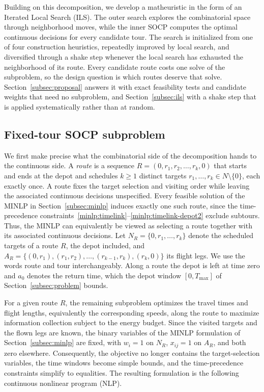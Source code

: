 Building on this decomposition, we develop a matheuristic in the form of an Iterated Local Search (ILS). The outer search explores the combinatorial space through neighborhood moves, while the inner SOCP computes the optimal continuous decisions for every candidate tour. The search is initialized from one of four construction heuristics, repeatedly improved by local search, and diversified through a shake step whenever the local search has exhausted the neighborhood of its route. Every candidate route costs one solve of the subproblem, so the design question is which routes deserve that solve. Section~\ref{subsec:proposal} answers it with exact feasibility tests and candidate weights that need no subproblem, and Section~\ref{subsec:ils} with a shake step that is applied systematically rather than at random.

\subsection{Fixed-tour SOCP subproblem}\label{subsec:socp}

We first make precise what the combinatorial side of the decomposition hands
to the continuous side. A \emph{route} is a sequence $R = (0, r_1, r_2, \ldots,
r_k, 0)$ that starts and ends at the depot and schedules $k \ge 1$ distinct targets
$r_1, \ldots, r_k \in N \setminus \{0\}$, each exactly once. A route fixes the
target selection and visiting order while leaving the associated continuous decisions
unspecified. Every feasible solution of the MINLP in Section~\ref{subsec:minlp}
induces exactly one such route, since the time-precedence
constraints~\eqref{minlp:timelink}--\eqref{minlp:timelink-depot2}
exclude subtours. Thus, the MINLP can equivalently be viewed as selecting a route
together with its associated continuous decisions. Let $N_R = \{0, r_1, \ldots, r_k\}$
denote the scheduled targets of a route $R$, the depot included, and $A_R = \{(0,r_1), (r_1,r_2), \ldots, (r_{k-1},r_k),
(r_k,0)\}$ its flight legs. We use the words route and tour interchangeably. Along a route the depot is left at time zero and $a_0$ denotes the return time, which the depot window $[0, T_{\max}]$ of Section~\ref{subsec:problem} bounds.

For a given route $R$, the remaining subproblem optimizes the travel times and flight lengths, equivalently the corresponding speeds, along the route to maximize information collection subject to the energy budget. Since the visited targets and the flown legs are known, the binary variables of the MINLP formulation of Section~\ref{subsec:minlp} are fixed, with $w_i = 1$ on $N_R$, $x_{ij} = 1$ on $A_R$, and both zero elsewhere. Consequently, the objective no longer contains the target-selection variables, the time windows become simple bounds, and the time-precedence constraints simplify to equalities. The resulting formulation is the following continuous nonlinear program (NLP).

